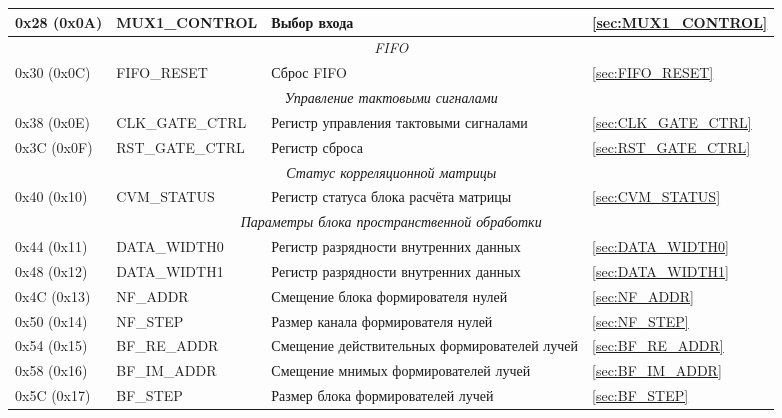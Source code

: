 \begin{longtable}{|p{30mm}|p{55mm}|p{6cm}|p{15mm}|}
\hline
0x28 (0x0A)  & MUX1\_CONTROL           	& Выбор входа                                   & \ref{sec:MUX1_CONTROL} \\
\hline
\multicolumn{4}{|c|}{\textit{FIFO}} \\
\hline
0x30 (0x0C)  & FIFO\_RESET           	& Сброс FIFO                                    & \ref{sec:FIFO_RESET} \\
\hline
\multicolumn{4}{|c|}{\textit{Управление тактовыми сигналами}} \\
\hline
0x38 (0x0E)  & CLK\_GATE\_CTRL        	& Регистр управления тактовыми сигналами        & \ref{sec:CLK_GATE_CTRL} \\
\hline
0x3C (0x0F)  & RST\_GATE\_CTRL        	& Регистр сброса                                & \ref{sec:RST_GATE_CTRL} \\
\hline


\multicolumn{4}{|c|}{\textit{Статус корреляционной матрицы}} \\
\hline
0x40 (0x10)  & CVM\_STATUS        	& Регистр статуса блока расчёта матрицы         & \ref{sec:CVM_STATUS} \\
\hline

\multicolumn{4}{|c|}{\textit{Параметры блока пространственной обработки}} \\
\hline
0x44 (0x11)  & DATA\_WIDTH0        	& Регистр разрядности внутренних данных         & \ref{sec:DATA_WIDTH0} \\
\hline
0x48 (0x12)  & DATA\_WIDTH1        	& Регистр разрядности внутренних данных         & \ref{sec:DATA_WIDTH1} \\
\hline

0x4C (0x13)  & NF\_ADDR          	& Смещение блока формирователя нулей            & \ref{sec:NF_ADDR} \\
\hline
0x50 (0x14)  & NF\_STEP          	& Размер канала формирователя нулей             & \ref{sec:NF_STEP} \\
\hline

0x54 (0x15)  & BF\_RE\_ADDR          	& Смещение действительных формирователей лучей  & \ref{sec:BF_RE_ADDR} \\
\hline
0x58 (0x16)  & BF\_IM\_ADDR          	& Смещение мнимых формирователей лучей          & \ref{sec:BF_IM_ADDR} \\
\hline
0x5C (0x17)  & BF\_STEP          	& Размер блока формирователей лучей             & \ref{sec:BF_STEP} \\
\hline


\end{longtable}
